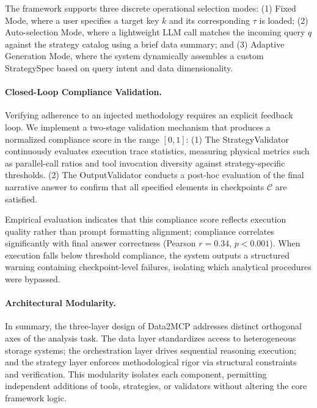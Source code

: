 The framework supports three discrete operational selection modes: (1) Fixed Mode, where a user specifies a target key $k$ and its corresponding $\tau$ is loaded; (2) Auto-selection Mode, where a lightweight LLM call matches the incoming query $q$ against the strategy catalog using a brief data summary; and (3) Adaptive Generation Mode, where the system dynamically assembles a custom StrategySpec based on query intent and data dimensionality.

\paragraph{Closed-Loop Compliance Validation.}
Verifying adherence to an injected methodology requires an explicit feedback loop. We implement a two-stage validation mechanism that produces a normalized compliance score in the range $[0, 1]$:
(1) The StrategyValidator continuously evaluates execution trace statistics, measuring physical metrics such as parallel-call ratios and tool invocation diversity against strategy-specific thresholds.
(2) The OutputValidator conducts a post-hoc evaluation of the final narrative answer to confirm that all specified elements in checkpoints $\mathcal{C}$ are satisfied.

Empirical evaluation indicates that this compliance score reflects execution quality rather than prompt formatting alignment; compliance correlates significantly with final answer correctness (Pearson $r=0.34$, $p<0.001$). When execution falls below threshold compliance, the system outputs a structured warning containing checkpoint-level failures, isolating which analytical procedures were bypassed.

\paragraph{Architectural Modularity.}
In summary, the three-layer design of Data2MCP addresses distinct orthogonal axes of the analysis task. The data layer standardizes access to heterogeneous storage systems; the orchestration layer drives sequential reasoning execution; and the strategy layer enforces methodological rigor via structural constraints and verification. This modularity isolates each component, permitting independent additions of tools, strategies, or validators without altering the core framework logic.